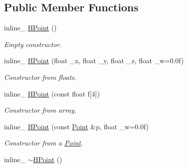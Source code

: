 \subsection*{Public Member Functions}
\begin{DoxyCompactItemize}
\item 
inline\+\_\+ \hyperlink{classOpcode_1_1HPoint_a4a8e379656ca01895806df81defea762}{H\+Point} ()\hypertarget{classOpcode_1_1HPoint_a4a8e379656ca01895806df81defea762}{}\label{classOpcode_1_1HPoint_a4a8e379656ca01895806df81defea762}

\begin{DoxyCompactList}\small\item\em Empty constructor. \end{DoxyCompactList}\item 
inline\+\_\+ \hyperlink{classOpcode_1_1HPoint_aeeba49165ed22d33c68763c4941ab003}{H\+Point} (float \+\_\+x, float \+\_\+y, float \+\_\+z, float \+\_\+w=0.\+0f)\hypertarget{classOpcode_1_1HPoint_aeeba49165ed22d33c68763c4941ab003}{}\label{classOpcode_1_1HPoint_aeeba49165ed22d33c68763c4941ab003}

\begin{DoxyCompactList}\small\item\em Constructor from floats. \end{DoxyCompactList}\item 
inline\+\_\+ \hyperlink{classOpcode_1_1HPoint_a99fce394c3ddc61b22f99b14c44a038a}{H\+Point} (const float f\mbox{[}4\mbox{]})\hypertarget{classOpcode_1_1HPoint_a99fce394c3ddc61b22f99b14c44a038a}{}\label{classOpcode_1_1HPoint_a99fce394c3ddc61b22f99b14c44a038a}

\begin{DoxyCompactList}\small\item\em Constructor from array. \end{DoxyCompactList}\item 
inline\+\_\+ \hyperlink{classOpcode_1_1HPoint_a29c9728031348987be9d38c4555a5eef}{H\+Point} (const \hyperlink{classOpcode_1_1Point}{Point} \&p, float \+\_\+w=0.\+0f)\hypertarget{classOpcode_1_1HPoint_a29c9728031348987be9d38c4555a5eef}{}\label{classOpcode_1_1HPoint_a29c9728031348987be9d38c4555a5eef}

\begin{DoxyCompactList}\small\item\em Constructor from a \hyperlink{classOpcode_1_1Point}{Point}. \end{DoxyCompactList}\item 
inline\+\_\+ \hyperlink{classOpcode_1_1HPoint_a5b860f9c67238055bddac5a9e6f91837}{$\sim$\+H\+Point} ()\hypertarget{classOpcode_1_1HPoint_a5b860f9c67238055bddac5a9e6f91837}{}\label{classOpcode_1_1HPoint_a5b860f9c67238055bddac5a9e6f91837}


\end{DoxyCompactItemize}
